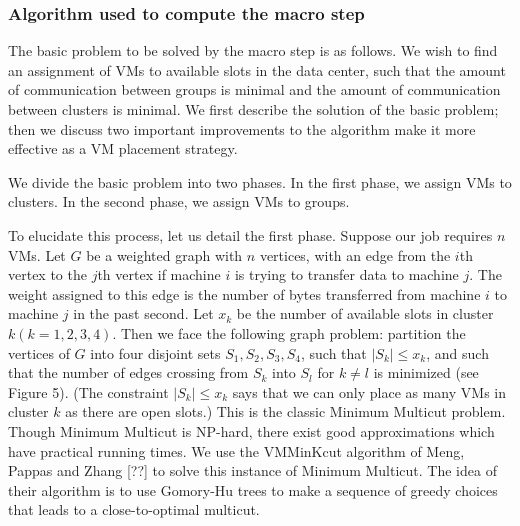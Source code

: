 \documentclass[11pt]{article}
\begin{document}
\subsubsection{Algorithm used to compute the macro step}

The basic problem to be solved by the macro step is as follows.  We wish to find an assignment of VMs to available slots in the data center, such that the amount of communication between groups is minimal and the amount of communication between clusters is minimal.  We first describe the solution of the basic problem; then we discuss two important improvements to the algorithm make it more effective as a VM placement strategy.

We divide the basic problem into two phases. In the first phase, we assign VMs to clusters.  In the second phase, we assign VMs to groups.

To elucidate this process, let us detail the first phase.  Suppose our job requires $n$ VMs.  Let $G$ be a weighted graph with $n$ vertices, with an edge from the $i$th vertex to the $j$th vertex if machine $i$ is trying to transfer data to machine $j$.  The weight assigned to this edge is the number of bytes transferred from machine $i$ to machine $j$ in the past second.  Let $x_k$ be the number of available slots in cluster $k (k = 1,2,3,4)$.  Then we face the following graph problem: partition the vertices of $G$ into four disjoint sets $S_1, S_2, S_3, S_4$, such that $|S_k| \leq x_k$, and such that the number of edges crossing from $S_k$ into $S_l$ for $k \neq l$ is minimized (see Figure 5).  (The constraint $|S_k| \leq x_k$ says that we can only place as many VMs in cluster $k$ as there are open slots.)  This is the classic Minimum Multicut problem.  Though Minimum Multicut is NP-hard, there exist good approximations which have practical running times.  We use the VMMinKcut algorithm of Meng, Pappas and Zhang [??] to solve this instance of Minimum Multicut.  The idea of their algorithm is to use Gomory-Hu trees to make a sequence of greedy choices that leads to a close-to-optimal multicut.
\end{document}
